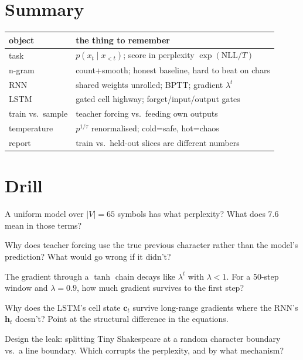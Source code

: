 \section{Summary}
\label{sec:seqsummary}

\begin{center}\small
\begin{tabular}{p{}p{}}
\toprule
object & the thing to remember \\
\midrule
task & $p(x_t\mid x_{<t})$; score in perplexity $\exp(\mathrm{NLL}/T)$ \\
n-gram & count+smooth; honest baseline, hard to beat on chars \\
RNN & shared weights unrolled; BPTT; gradient $\lambda^t$ \\
LSTM & gated cell highway; forget/input/output gates \\
train vs.\ sample & teacher forcing vs.\ feeding own outputs \\
temperature & $p^{1/\tau}$ renormalised; cold=safe, hot=chaos \\
report & train vs.\ held-out slices are different numbers \\
\bottomrule
\end{tabular}
\end{center}

\section*{Drill}
\begin{exercise}[{[easy]}]
A uniform model over $|V|=65$ symbols has what perplexity? What does
7.6 mean in those terms?
\end{exercise}
\begin{exercise}[{[easy]}]
Why does teacher forcing use the true previous character rather than
the model's prediction? What would go wrong if it didn't?
\end{exercise}
\begin{exercise}[{[medium]}]
The gradient through a $\tanh$ chain decays like $\lambda^t$ with
$\lambda<1$. For a 50-step window and $\lambda=0.9$, how much
gradient survives to the first step?
\end{exercise}
\begin{exercise}[{[medium]}]
Why does the LSTM's cell state $\mathbf c_t$ survive long-range
gradients where the RNN's $\mathbf h_t$ doesn't? Point at the
structural difference in the equations.
\end{exercise}
\begin{exercise}[{[hard]}]
Design the leak: splitting Tiny Shakespeare at a random character
boundary vs.\ a line boundary. Which corrupts the perplexity, and by
what mechanism?
\end{exercise}

